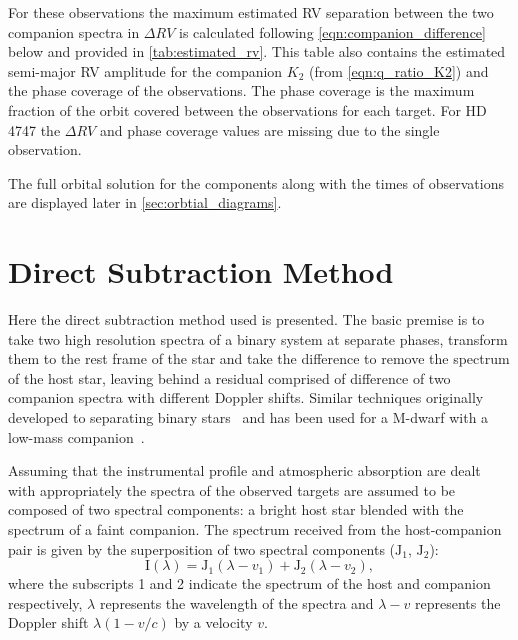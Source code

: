 For these observations the maximum estimated {RV} separation between the two companion spectra in \(\Delta {RV}\) is calculated following \cref{eqn:companion_difference} below and provided in \cref{tab:estimated_rv}.
This table also contains the estimated semi-major {RV} amplitude for the companion \(K_2\) (from \cref{eqn:q_ratio_K2}) and the phase coverage of the observations.
The phase coverage is the maximum fraction of the orbit covered between the observations for each target.
For {HD\,4747} the \(\Delta {RV}\) and phase coverage values are missing due to the single observation.




The full orbital solution for the components along with the times of observations are displayed later in \cref{sec:orbtial_diagrams}.


\section{Direct Subtraction Method}
\label{sec:direct-subtraction}
Here the direct subtraction method used is presented.
The basic premise is to take two high resolution spectra of a binary system at separate phases, transform them to the rest frame of the star and take the difference to remove the spectrum of the host star, leaving behind a residual comprised of difference of two companion spectra with different Doppler shifts.
Similar techniques originally developed to separating binary stars~\citep{ferluga_separating_1997} and has been used for a M-dwarf with a low-mass companion~\citep[e.g.][]{kostogryz_spectral_2013}.

Assuming that the instrumental profile and atmospheric absorption are dealt with appropriately the spectra of the observed targets are assumed to be composed of two spectral components:
a bright host star blended with the spectrum of a faint companion.
The spectrum received from the host-companion pair is given by the superposition of two spectral components (\(\textrm{J}_{1}\), \(\textrm{J}_{2}\)):
\begin{equation}
\textrm{I}(\lambda) = \textrm{J}_{1}(\lambda - v_{1}) + \textrm{J}_{2}(\lambda - v_{2}),
\end{equation}
where the subscripts 1 and 2 indicate the spectrum of the host and companion respectively, \(\lambda\) represents the wavelength of the spectra and \(\lambda-v\) represents the Doppler shift \(\lambda(1-v/c)\) by a velocity \(v\).

